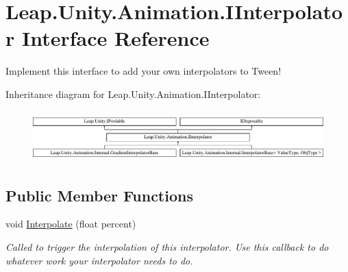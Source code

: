 \hypertarget{interface_leap_1_1_unity_1_1_animation_1_1_i_interpolator}{}\section{Leap.\+Unity.\+Animation.\+I\+Interpolator Interface Reference}
\label{interface_leap_1_1_unity_1_1_animation_1_1_i_interpolator}


Implement this interface to add your own interpolators to Tween!  


Inheritance diagram for Leap.\+Unity.\+Animation.\+I\+Interpolator\+:\begin{figure}[H]
\begin{center}
\leavevmode
\includegraphics[height=1.985816cm]{interface_leap_1_1_unity_1_1_animation_1_1_i_interpolator}
\end{center}
\end{figure}
\subsection*{Public Member Functions}
\begin{DoxyCompactItemize}
\item 
void \mbox{\hyperlink{interface_leap_1_1_unity_1_1_animation_1_1_i_interpolator_a4ddd3ea9f35d3f2568921ad2f1112869}{Interpolate}} (float percent)
\begin{DoxyCompactList}\small\item\em Called to trigger the interpolation of this interpolator. Use this callback to do whatever work your interpolator needs to do. \end{DoxyCompactList}\end{DoxyCompactItemize}
